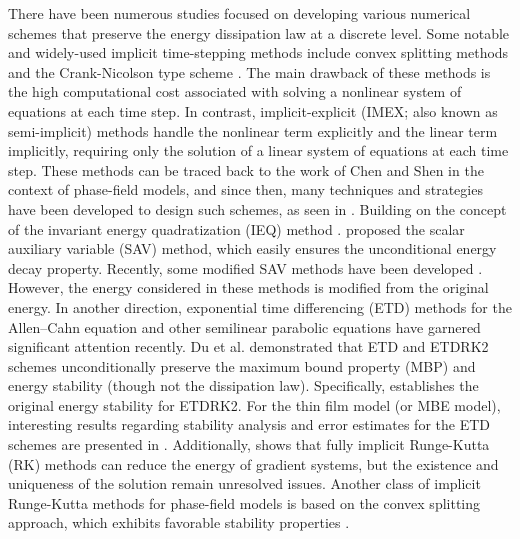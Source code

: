 \documentclass[a4paper, oneside]{book}
\begin{document}
There have been numerous studies focused on developing various numerical schemes that preserve the energy dissipation law at a discrete level. Some notable and widely-used implicit time-stepping methods include convex splitting methods \cite{gradsys, epitaxy3} and the Crank-Nicolson type scheme \cite{MR4242247, CHCN1}. The main drawback of these methods is the high computational cost associated with solving a nonlinear system of equations at each time step. In contrast, implicit-explicit (IMEX; also known as semi-implicit) methods handle the nonlinear term explicitly and the linear term implicitly, requiring only the solution of a linear system of equations at each time step. These methods can be traced back to the work of Chen and Shen \cite{IMEXpf1} in the context of phase-field models, and since then, many techniques and strategies have been developed to design such schemes, as seen in \cite{akrivis2019energy, Wangxm, yang2015SDC, splitting1, xuyan, opspltLi, shen2019new, ACCH, ATA}. Building on the concept of the invariant energy quadratization (IEQ) method \cite{IEQ1, IEQ2}. \cite{ShenXu:2018, shen2019new} proposed the scalar auxiliary variable (SAV) method, which easily ensures the unconditional energy decay property. Recently, some modified SAV methods have been developed \cite{SAVcheng, SAVxu, SAVqiao, TWY-JSC22}. However, the energy considered in these methods is modified from the original energy. In another direction, exponential time differencing (ETD) methods for the Allen–Cahn equation and other semilinear parabolic equations have garnered significant attention recently. Du et al. \cite{DuJuLiQiao:2019} demonstrated that ETD and ETDRK2 schemes unconditionally preserve the maximum bound property (MBP) and energy stability (though not the dissipation law). Specifically, \cite{fuyangetd} establishes the original energy stability for ETDRK2. For the thin film model (or MBE model), interesting results regarding stability analysis and error estimates for the ETD schemes are presented in \cite{ETDstiff, ETDanal, ju2018energy, epxywithornot, epitaxy4}. Additionally, \cite{fimRk} shows that fully implicit Runge-Kutta (RK) methods can reduce the energy of gradient systems, but the existence and uniqueness of the solution remain unresolved issues. Another class of implicit Runge-Kutta methods for phase-field models is based on the convex splitting approach, which exhibits favorable stability properties \cite{convexsplitphasefield}.
\end{document}
